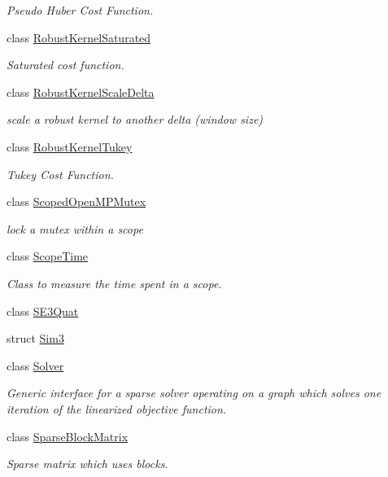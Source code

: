 \begin{DoxyCompactItemize}
\begin{DoxyCompactList}\small\item\em Pseudo Huber Cost Function. \end{DoxyCompactList}\item 
class \hyperlink{classg2o_1_1RobustKernelSaturated}{Robust\+Kernel\+Saturated}
\begin{DoxyCompactList}\small\item\em Saturated cost function. \end{DoxyCompactList}\item 
class \hyperlink{classg2o_1_1RobustKernelScaleDelta}{Robust\+Kernel\+Scale\+Delta}
\begin{DoxyCompactList}\small\item\em scale a robust kernel to another delta (window size) \end{DoxyCompactList}\item 
class \hyperlink{classg2o_1_1RobustKernelTukey}{Robust\+Kernel\+Tukey}
\begin{DoxyCompactList}\small\item\em Tukey Cost Function. \end{DoxyCompactList}\item 
class \hyperlink{classg2o_1_1ScopedOpenMPMutex}{Scoped\+Open\+M\+P\+Mutex}
\begin{DoxyCompactList}\small\item\em lock a mutex within a scope \end{DoxyCompactList}\item 
class \hyperlink{classg2o_1_1ScopeTime}{Scope\+Time}
\begin{DoxyCompactList}\small\item\em Class to measure the time spent in a scope. \end{DoxyCompactList}\item 
class \hyperlink{classg2o_1_1SE3Quat}{S\+E3\+Quat}
\item 
struct \hyperlink{structg2o_1_1Sim3}{Sim3}
\item 
class \hyperlink{classg2o_1_1Solver}{Solver}
\begin{DoxyCompactList}\small\item\em Generic interface for a sparse solver operating on a graph which solves one iteration of the linearized objective function. \end{DoxyCompactList}\item 
class \hyperlink{classg2o_1_1SparseBlockMatrix}{Sparse\+Block\+Matrix}
\begin{DoxyCompactList}\small\item\em Sparse matrix which uses blocks. \end{DoxyCompactList}\item 

\end{DoxyCompactItemize}
